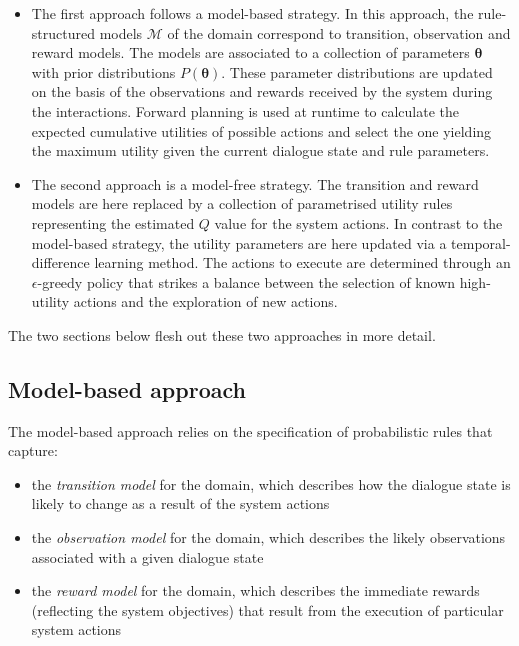 \begin{itemize}
\item The first approach follows a model-based strategy.  In this approach, the rule-structured models $\mathcal{M}$ of the domain correspond to transition, observation and reward models. The models are associated to a collection of parameters $\boldsymbol\theta$ with prior distributions $P(\boldsymbol\theta)$.  These parameter distributions are updated on the basis of the observations and rewards received by the system during the interactions. Forward planning is used at runtime to calculate the expected cumulative utilities of possible actions and select the one yielding the maximum utility given the current dialogue state and rule parameters. 

\item The second approach is a model-free strategy.  The transition and reward models are here replaced by  a collection of parametrised utility rules representing the estimated $Q$ value for the system actions. In contrast to the model-based strategy, the utility parameters are here updated via a temporal-difference learning method.  The actions to execute are determined through an $\epsilon$-greedy policy that strikes a balance between the selection of known high-utility actions and the exploration of new actions.

\end{itemize}

The two sections below flesh out these two approaches in more detail. 

\subsection{Model-based approach}
\label{sec:modelbased}

The model-based approach relies on the specification of probabilistic rules that capture:
\begin{itemize}
\item the \textit{transition model} for the domain, which describes how the dialogue state is likely to change as a result of the system actions
\item the \textit{observation model} for the domain, which describes the likely observations associated with a given dialogue state
\item the \textit{reward model} for the domain, which describes the immediate rewards (reflecting the system objectives) that result from the execution of particular system actions
\end{itemize}

